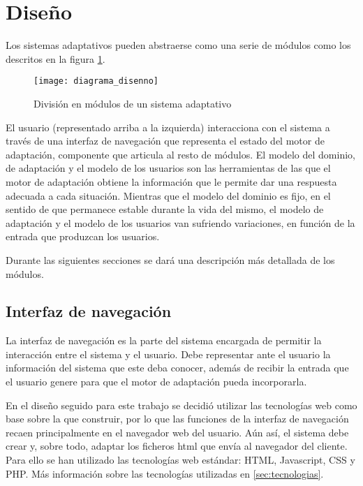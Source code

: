 
\section{Diseño}

Los sistemas adaptativos pueden abstraerse como una serie de módulos como los descritos en la figura \ref{fig:diagrama_disenno}. 

\begin{figure}[htp!]
	\centering
	\texttt{[image: diagrama\_disenno]}
	\caption{División en módulos de un sistema adaptativo}
	\label{fig:diagrama_disenno}
\end{figure}

El usuario (representado arriba a la izquierda) interacciona con el sistema a través de una interfaz de navegación que representa el estado del motor de adaptación, componente que articula al resto de módulos. El modelo del dominio, de adaptación y el modelo de los usuarios son las herramientas de las que el motor de adaptación obtiene la información que le permite dar una respuesta adecuada a cada situación. Mientras que el modelo del dominio es fijo, en el sentido de que permanece estable durante la vida del mismo, el modelo de adaptación y el modelo de los usuarios van sufriendo variaciones, en función de la entrada que produzcan los usuarios.

Durante las siguientes secciones se dará una descripción más detallada de los módulos.

\subsection{Interfaz de navegación}

La interfaz de navegación es la parte del sistema encargada de permitir la interacción entre el sistema y el usuario. Debe representar ante el usuario la información del sistema que este deba conocer, además de recibir la entrada que el usuario genere para que el motor de adaptación pueda incorporarla.

En el diseño seguido para este trabajo se decidió utilizar las tecnologías web como base sobre la que construir, por lo que las funciones de la interfaz de navegación recaen principalmente en el navegador web del usuario. Aún así, el sistema debe crear y, sobre todo, adaptar los ficheros html que envía al navegador del cliente. Para ello se han utilizado las tecnologías web estándar: HTML, Javascript, CSS y PHP. Más información sobre las tecnologías utilizadas en \ref{sec:tecnologias}.

